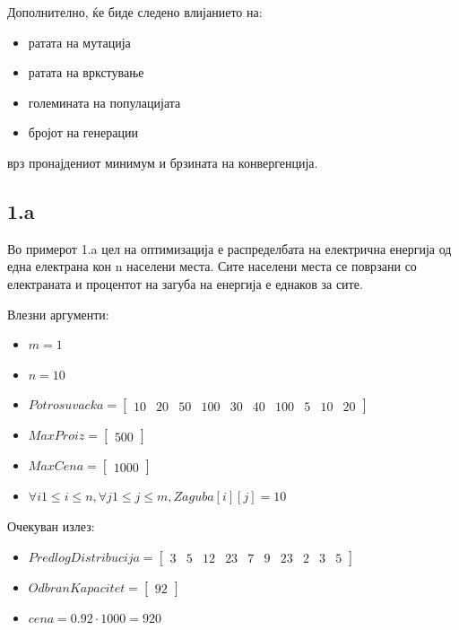 \documentclass{article}
\begin{document}
Дополнително, ќе биде следено влијанието на:
\begin{itemize}
\item ратата на мутација
\item ратата на вркстување
\item големината на популацијата
\item бројот на генерации
\end{itemize}

врз пронајдениот минимум и брзината на конвергенција.

\subsection{1.a}
Во примерот 1.a цел на оптимизација е распределбата на електрична енергија од една електрана кон n населени места. Сите населени места се поврзани со електраната и процентот на загуба на енергија е еднаков за сите.

Влезни аргументи: 
\begin{itemize}
\item $m = 1$
\item $n = 10$
\item $Potrosuvacka = \begin{bmatrix} 10 & 20 & 50 & 100 & 30 & 40 & 100 & 5 & 10 & 20\end{bmatrix}$
\item $MaxProiz = \begin{bmatrix} 500 \end{bmatrix}$
\item $MaxCena = \begin{bmatrix} 1000 \end{bmatrix}$
\item $\forall i 1 \leq i \leq n, \forall j 1 \leq j \leq m, Zaguba[i][j] = 10$

\end{itemize}

Очекуван излез:
\begin{itemize}
\item $PredlogDistribucija = \begin{bmatrix} 3 & 5 & 12 & 23 & 7 & 9 & 23 & 2 & 3 & 5\end{bmatrix}$
\item $ OdbranKapacitet = \begin{bmatrix} 92 \end{bmatrix}$
\item $cena = 0.92 \cdot 1000 = 920 $
\end{itemize}
\end{document}
